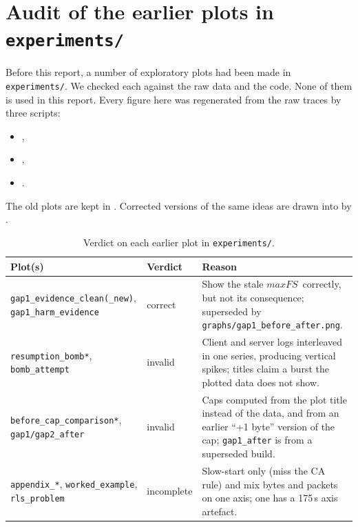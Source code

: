 \documentclass[11pt,a4paper]{article}
\newcommand{\maxfs}{\ensuremath{\mathit{maxFS}}}
\begin{document}
\appendix

\section{Audit of the earlier plots in \texttt{experiments/}}
\label{app:audit}

Before this report, a number of exploratory plots had been made in
\texttt{experiments/}. We checked each against the raw data and the code.
None of them is used in this report. Every figure here was regenerated from
the raw traces by three scripts:
\begin{itemize}
  \item {},
  \item {},
  \item {}.
\end{itemize}
The old plots are kept in . Corrected versions of
the same ideas are drawn into  by
.

\begin{table}[H]
\caption{Verdict on each earlier plot in \texttt{experiments/}.}
\centering
\small
\begin{tabularx}{\textwidth}{@{}>{\raggedright\arraybackslash}p{4.6cm} l X@{}}
\toprule
Plot(s) & Verdict & Reason \\
\midrule
\texttt{gap1\_evidence\_clean(\_new)}, \texttt{gap1\_harm\_evidence} &
  correct & Show the stale \maxfs\ correctly, but not its consequence;
  superseded by \texttt{graphs/gap1\_before\_after.png}. \\
\texttt{resumption\_bomb*}, \texttt{bomb\_attempt} &
  invalid & Client and server logs interleaved in one series, producing
  vertical spikes; titles claim a burst the plotted data does not show. \\
\texttt{before\_cap\_comparison*}, \texttt{gap1/gap2\_after} &
  invalid & Caps computed from the plot title instead of the data, and from an
  earlier ``+1 byte'' version of the cap; \texttt{gap1\_after} is from a
  superseded build. \\
\texttt{appendix\_*}, \texttt{worked\_\-example}, \texttt{rls\_\-problem} &
  incomplete & Slow-start only (miss the CA rule) and mix bytes and packets
  on one axis; one has a 175\,s axis artefact. \\
\bottomrule
\end{tabularx}
\end{table}
\end{document}
